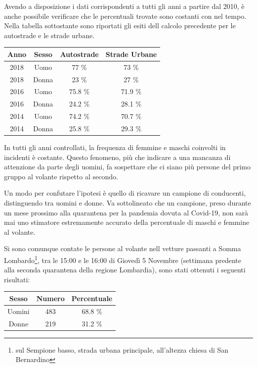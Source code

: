 \documentclass[a4paper,12pt]{report}
\begin{document}
Avendo a disposizione i dati corrispondenti a tutti gli anni a partire dal 2010, 
è anche possibile verificare che le percentuali trovate sono costanti con 
nel tempo. 
Nella tabella sottostante sono riportati gli esiti dell calcolo precedente per le 
autostrade e le strade urbane. 

\begin{center}
    \def\arraystretch{1.5}%
    \begin{tabular}{ |c|c|c|c| }
        \hline
        Anno & Sesso & Autostrade & Strade Urbane \\ 
        \hline
        \rowcolor{TableGray}
        2018 & Uomo & 77 \%  & 73 \% \\
        2018 & Donna & 23 \% & 27 \% \\
        \rowcolor{TableGray}
        2016 & Uomo & 75.8 \%  & 71.9 \% \\
        2016 & Donna & 24.2 \% & 28.1 \% \\
        \rowcolor{TableGray}
        2014 & Uomo & 74.2 \%  & 70.7 \% \\
        2014 & Donna & 25.8 \% & 29.3 \% \\
        \hline
    \end{tabular}
\end{center}

In tutti gli anni controllati, la frequenza di femmine e maschi coinvolti 
in incidenti è costante. 
Questo fenomeno, più che indicare a una mancanza di attenzione da parte degli uomini, 
fa sospettare che ci siano più persone del primo gruppo al volante rispetto al secondo. 

Un modo per confutare l'ipotesi è quello di ricavare un campione di conducenti, 
distinguendo tra uomini e donne. 
Va sottolineato che un campione, preso durante un mese prossimo alla quarantena per 
la pandemia dovuta al Covid-19, non sarà mai uno stimatore estremamente 
accurato della percentuale di maschi e femmine al volante. 

Si sono comunque contate le persone al volante nell vetture passanti a Somma 
Lombardo\footnote{sul Sempione basso, strada urbana principale, 
all'altezza chiesa di San Bernardino}, 
tra le 15:00 e le 16:00 di Giovedì 5 Novembre 
(settimana predente alla seconda quarantena della regione Lombardia), 
sono stati ottenuti i seguenti risultati:

\begin{center}
    \def\arraystretch{1.5}%
    \begin{tabular}{ |c|c|c| }
        \hline
        Sesso & Numero & Percentuale \\ 
        \hline
        \rowcolor{TableGray}
        Uomini & 483 & 68.8 \% \\
        Donne & 219 & 31.2 \% \\
        \hline
    \end{tabular}
\end{center}
\end{document}
